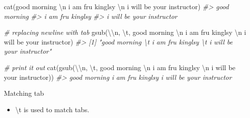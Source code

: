 \documentclass[
]{book}
\newenvironment{Shaded}{\begin{snugshade}}{\end{snugshade}}
\newcommand{\CommentTok}[1]{\textcolor[rgb]{0.56,0.35,0.01}{\textit{#1}}}
\newcommand{\FunctionTok}[1]{\textcolor[rgb]{0.00,0.00,0.00}{#1}}
\newcommand{\NormalTok}[1]{#1}
\newcommand{\SpecialCharTok}[1]{\textcolor[rgb]{0.00,0.00,0.00}{#1}}
\newcommand{\StringTok}[1]{\textcolor[rgb]{0.31,0.60,0.02}{#1}}
\providecommand{\tightlist}{%
  \setlength{\itemsep}{0pt}\setlength{\parskip}{0pt}}
\begin{document}
\begin{Shaded}
\begin{Highlighting}[]
\FunctionTok{cat}\NormalTok{(}\StringTok{\textquotesingle{}good morning }\SpecialCharTok{\textbackslash{}n}\StringTok{ i am fru kinglsy }\SpecialCharTok{\textbackslash{}n}\StringTok{ i will be your instructor\textquotesingle{}}\NormalTok{)}
\CommentTok{\#\textgreater{} good morning }
\CommentTok{\#\textgreater{}  i am fru kinglsy }
\CommentTok{\#\textgreater{}  i will be your instructor}

\CommentTok{\# replacing newline with tab}
\FunctionTok{gsub}\NormalTok{(}\StringTok{\textquotesingle{}}\SpecialCharTok{\textbackslash{}\textbackslash{}}\StringTok{n\textquotesingle{}}\NormalTok{, }\StringTok{\textquotesingle{}}\SpecialCharTok{\textbackslash{}t}\StringTok{\textquotesingle{}}\NormalTok{, }\StringTok{\textquotesingle{}good morning }\SpecialCharTok{\textbackslash{}n}\StringTok{ i am fru kinglsy }\SpecialCharTok{\textbackslash{}n}\StringTok{ i will be your instructor\textquotesingle{}}\NormalTok{)}
\CommentTok{\#\textgreater{} [1] "good morning \textbackslash{}t i am fru kinglsy \textbackslash{}t i will be your instructor"}

\CommentTok{\# print it out}
\FunctionTok{cat}\NormalTok{(}\FunctionTok{gsub}\NormalTok{(}\StringTok{\textquotesingle{}}\SpecialCharTok{\textbackslash{}\textbackslash{}}\StringTok{n\textquotesingle{}}\NormalTok{, }\StringTok{\textquotesingle{}}\SpecialCharTok{\textbackslash{}t}\StringTok{\textquotesingle{}}\NormalTok{, }\StringTok{\textquotesingle{}good morning }\SpecialCharTok{\textbackslash{}n}\StringTok{ i am fru kinglsy }\SpecialCharTok{\textbackslash{}n}\StringTok{ i will be your instructor\textquotesingle{}}\NormalTok{))}
\CommentTok{\#\textgreater{} good morning      i am fru kinglsy    i will be your instructor}
\end{Highlighting}
\end{Shaded}

Matching tab

\begin{itemize}
\tightlist
\item
  \textbackslash t is used to match tabs.
\end{itemize}
\end{document}
